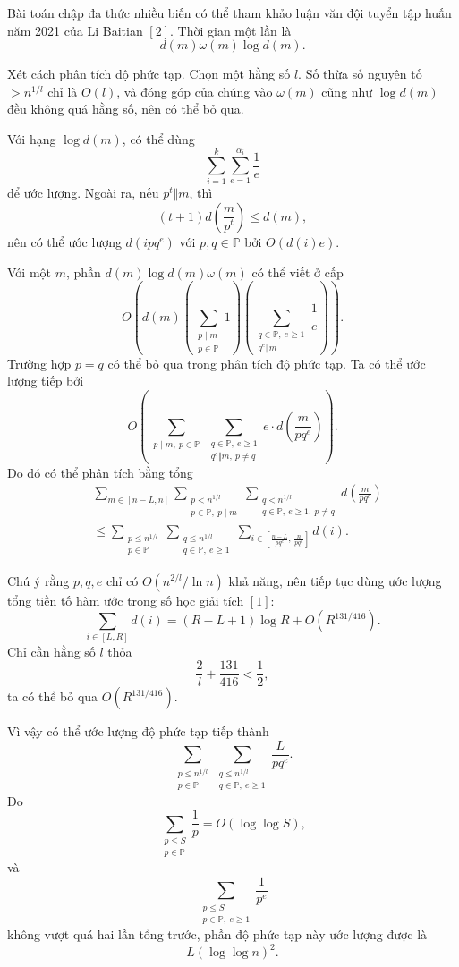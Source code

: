 \documentclass[11pt]{article}
\begin{document}
Bài toán chập đa thức nhiều biến có thể tham khảo luận văn đội tuyển tập huấn
năm 2021 của Li Baitian \([2]\). Thời gian một lần là
\[
  d(m)\omega(m)\log d(m).
\]

Xét cách phân tích độ phức tạp. Chọn một hằng số \(l\). Số thừa số nguyên tố
\(>n^{1/l}\) chỉ là \(O(l)\), và đóng góp của chúng vào \(\omega(m)\) cũng như
\(\log d(m)\) đều không quá hằng số, nên có thể bỏ qua.

Với hạng \(\log d(m)\), có thể dùng
\[
  \sum_{i=1}^{k}\sum_{e=1}^{\alpha_i}\frac1e
\]
để ước lượng. Ngoài ra, nếu \(p^t\Vert m\), thì
\[
  (t+1)d\left(\frac{m}{p^t}\right)\le d(m),
\]
nên có thể ước lượng \(d(ipq^e)\) với \(p,q\in\mathbb P\) bởi \(O(d(i)e)\).

Với một \(m\), phần \(d(m)\log d(m)\omega(m)\) có thể viết ở cấp
\[
  O\left(d(m)
  \left(\sum_{\substack{p\mid m\\p\in\mathbb P}}1\right)
  \left(\sum_{\substack{q\in\mathbb P,\ e\ge 1\\q^e\Vert m}}\frac1e\right)
  \right).
\]
Trường hợp \(p=q\) có thể bỏ qua trong phân tích độ phức tạp. Ta có thể ước
lượng tiếp bởi
\[
  O\left(
  \sum_{\substack{p\mid m,\ p\in\mathbb P}}
  \sum_{\substack{q\in\mathbb P,\ e\ge 1\\q^e\Vert m,\ p\ne q}}
  e\cdot d\left(\frac{m}{pq^e}\right)
  \right).
\]
Do đó có thể phân tích bằng tổng
\[
\begin{aligned}
&\sum_{m\in[n-L,n]}
  \sum_{\substack{p<n^{1/l}\\p\in\mathbb P,\ p\mid m}}
  \sum_{\substack{q<n^{1/l}\\q\in\mathbb P,\ e\ge 1,\ p\ne q}}
  d\left(\frac{m}{pq^e}\right)\\
&\le
  \sum_{\substack{p\le n^{1/l}\\p\in\mathbb P}}
  \sum_{\substack{q\le n^{1/l}\\q\in\mathbb P,\ e\ge 1}}
  \sum_{i\in\left[\frac{n-L}{pq^e},\,\frac{n}{pq^e}\right]} d(i).
\end{aligned}
\]

Chú ý rằng \(p,q,e\) chỉ có \(O(n^{2/l}/\ln n)\) khả năng, nên tiếp tục dùng
ước lượng tổng tiền tố hàm ước trong số học giải tích \([1]\):
\[
  \sum_{i\in[L,R]}d(i)
  =
  (R-L+1)\log R+O(R^{131/416}).
\]
Chỉ cần hằng số \(l\) thỏa
\[
  \frac{2}{l}+\frac{131}{416}<\frac12,
\]
ta có thể bỏ qua \(O(R^{131/416})\).

Vì vậy có thể ước lượng độ phức tạp tiếp thành
\[
  \sum_{\substack{p\le n^{1/l}\\p\in\mathbb P}}
  \sum_{\substack{q\le n^{1/l}\\q\in\mathbb P,\ e\ge 1}}
  \frac{L}{pq^e}.
\]
Do
\[
  \sum_{\substack{p\le S\\p\in\mathbb P}}\frac1p
  = O(\log\log S),
\]
và
\[
  \sum_{\substack{p\le S\\p\in\mathbb P,\ e\ge 1}}\frac1{p^e}
\]
không vượt quá hai lần tổng trước, phần độ phức tạp này ước lượng được là
\[
  L(\log\log n)^2.
\]
\end{document}

